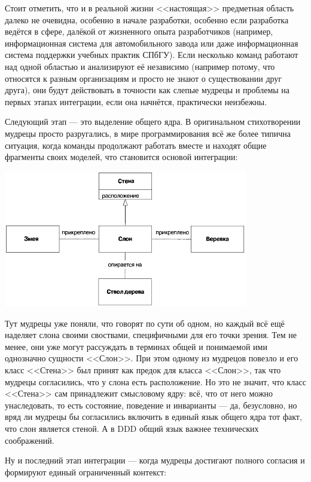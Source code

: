 \documentclass[a5paper]{article}
\begin{document}
Стоит отметить, что и в реальной жизни <<настоящая>> предметная область далеко не очевидна, особенно в начале разработки, особенно если разработка ведётся в сфере, далёкой от жизненного опыта разработчиков (например, информационная система для автомобильного завода или даже информационная система поддержки учебных практик СПбГУ). Если несколько команд работают над одной областью и анализируют её независимо (например потому, что относятся к разным организациям и просто не знают о существовании друг друга), они будут действовать в точности как слепые мудрецы и проблемы на первых этапах интеграции, если она начнётся, практически неизбежны.

Следующий этап --- это выделение общего ядра. В оригинальном стихотворении мудрецы просто разругались, в мире программирования всё же более типична ситуация, когда команды продолжают работать вместе и находят общие фрагменты своих моделей, что становится основой интеграции:

\begin{center}
    \includegraphics[width=0.8\textwidth]{elephantSharedKernel.png}
\end{center}

Тут мудрецы уже поняли, что говорят по сути об одном, но каждый всё ещё наделяет слона своими своствами, специфичными для его точки зрения. Тем не менее, они уже могут рассуждать в терминах общей и понимаемой ими однозначно сущности <<Слон>>. При этом одному из мудрецов повезло и его класс <<Стена>> был принят как предок для класса <<Слон>>, так что мудрецы согласились, что у слона есть расположение. Но это не значит, что класс <<Стена>> сам принадлежит смысловому ядру: всё, что от него можно унаследовать, то есть состояние, поведение и инварианты --- да, безусловно, но вряд ли мудрецы бы согласились включить в единый язык общего ядра тот факт, что слон является стеной. А в DDD общий язык важнее технических соображений.

Ну и последний этап интеграции --- когда мудрецы достигают полного согласия и формируют единый ограниченный контекст:
\end{document}
